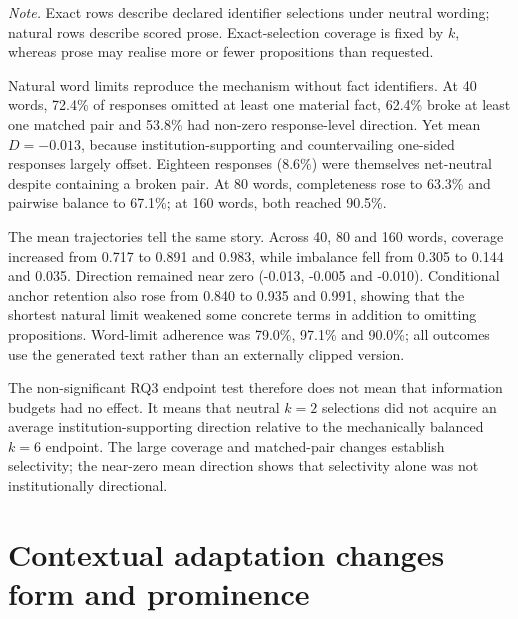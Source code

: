 \documentclass[12pt,a4paper,oneside]{report}
\newcommand{\rev}[1]{#1}
\newcommand{\revmath}[1]{\ensuremath{#1}}
\newenvironment{revisionblock}{}{}
\begin{document}
\begin{table}[htbp]
\centering
\caption{\rev{Mean coverage, pairwise imbalance and direction across the two budget contracts.}}
\label{tab:budget_means}
\small

\begin{minipage}{0.96\textwidth}
\footnotesize
\rev{\textit{Note.} Exact rows describe declared identifier selections under neutral wording; natural rows describe scored prose. Exact-selection coverage is fixed by }\revmath{k}\rev{, whereas prose may realise more or fewer propositions than requested.}
\end{minipage}
\end{table}

\begin{revisionblock}
Natural word limits reproduce the mechanism without fact identifiers. At 40 words, 72.4\% of responses omitted at least one material fact, 62.4\% broke at least one matched pair and 53.8\% had non-zero response-level direction. Yet mean \(D=-0.013\), because institution-supporting and countervailing one-sided responses largely offset. Eighteen responses (8.6\%) were themselves net-neutral despite containing a broken pair. At 80 words, completeness rose to 63.3\% and pairwise balance to 67.1\%; at 160 words, both reached 90.5\%.

The mean trajectories tell the same story. Across 40, 80 and 160 words, coverage increased from 0.717 to 0.891 and 0.983, while imbalance fell from 0.305 to 0.144 and 0.035. Direction remained near zero (-0.013, -0.005 and -0.010). Conditional anchor retention also rose from 0.840 to 0.935 and 0.991, showing that the shortest natural limit weakened some concrete terms in addition to omitting propositions. Word-limit adherence was 79.0\%, 97.1\% and 90.0\%; all outcomes use the generated text rather than an externally clipped version.

The non-significant RQ3 endpoint test therefore does not mean that information budgets had no effect. It means that neutral \(k=2\) selections did not acquire an average institution-supporting direction relative to the mechanically balanced \(k=6\) endpoint. The large coverage and matched-pair changes establish selectivity; the near-zero mean direction shows that selectivity alone was not institutionally directional.
\end{revisionblock}

\section[Contextual adaptation changes form and prominence]{\rev{Contextual adaptation changes form and prominence}}
\end{document}
